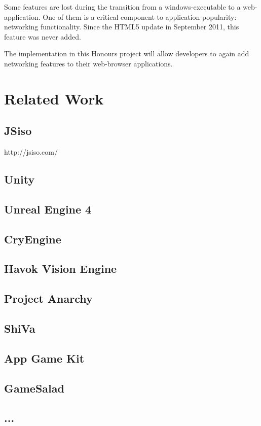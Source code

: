 \documentclass[bsc,frontabs,twoside,singlespacing,parskip,deptreport]{infthesis}     %
\begin{document}
Some features are lost during the transition from a windows-executable to a web-application. One of them is a critical component to application popularity: networking functionality. Since the HTML5 update in September 2011, this feature was never added.

The implementation in this Honours project will allow developers to again add networking features to their web-browser applications.

\section{Related Work}
\subsection{JSiso}http://jsiso.com/
\subsection{Unity}
\subsection{Unreal Engine 4}
\subsection{CryEngine}
\subsection{Havok Vision Engine}
\subsection{Project Anarchy}
\subsection{ShiVa}
\subsection{App Game Kit}
\subsection{GameSalad}
\subsection{...}
\end{document}
